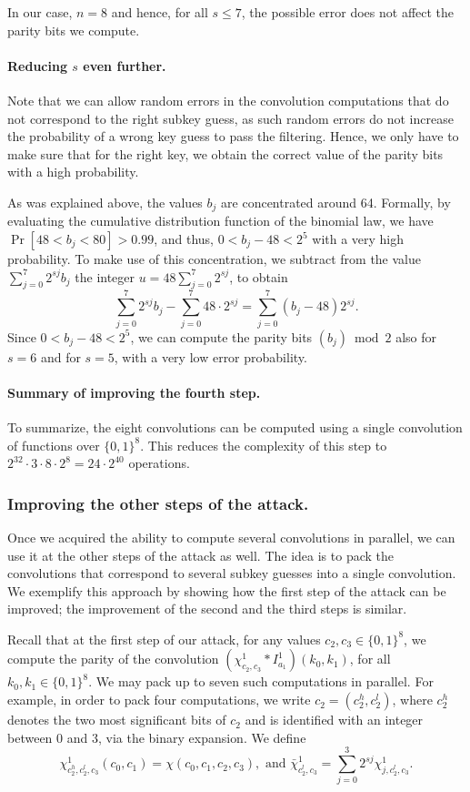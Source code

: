 In our case, $n=8$ and hence, for all $s \leq 7$, the possible error does not affect the parity bits we compute.

\paragraph{Reducing $s$ even further.} Note that we can allow random errors in the convolution computations that do not correspond to the right subkey guess, as such random errors do not increase the probability of a wrong key guess to pass the filtering. Hence, we only have to make sure that for the right key, we obtain the correct value of the parity bits with a high probability.

As was explained above, the values $b_j$ are concentrated around 64.
Formally, by evaluating the cumulative distribution function of the binomial law, we have $\Pr[48 < b_j < 80] >0.99$, and thus, $0<b_j-48<2^5$ with a very high probability.
To make use of this concentration, we subtract from the value  $\sum_{j=0}^7 2^{sj}b_j$ the integer $u=48\sum_{j=0}^7 2^{sj}$, to obtain 
$$
\sum_{j=0}^7 2^{sj}b_j - \sum_{j=0}^7 48 \cdot 2^{sj} = \sum_{j=0}^7 (b_j-48)2^{sj}. 
$$
Since $0<b_j-48<2^5$, we can compute the parity bits $(b_j)\bmod 2$ also for $s=6$ and for $s=5$, with a very low error probability.
\paragraph{Summary of improving the fourth step.} To summarize, the eight convolutions can be computed using a single convolution of functions over $\{0,1\}^8$. This reduces the complexity of this step to $2^{32} \cdot 3 \cdot 8 \cdot 2^8 = 24 \cdot 2^{40}$ operations.

\subsubsection{Improving the other steps of the attack.} Once we acquired the ability to compute several convolutions in parallel, we can use it at the other steps of the attack as well. The idea is to pack the convolutions that correspond to several subkey guesses into a single convolution. We exemplify this approach by showing how the first step of the attack can be improved; the improvement of the second and the third steps is similar. 

Recall that at the first step of our attack, for any values $c_2,c_3 \in \{0,1\}^8$, we compute the parity of the convolution
$(\chi^1_{c_2,c_3} * I^1_{a_1})(k_0,k_1)$, for all $k_0,k_1 \in \{0,1\}^8$. We may pack up to seven such computations in parallel. For example, in order to pack four computations, we write $c_2=(c_2^h,c_2^l)$, where $c_2^h$ denotes the two most significant bits of $c_{2}$ and is identified with an integer between 0 and 3, via the binary expansion. We define
$$
\chi^1_{c_2^h,c_2^l,c_3}(c_0,c_1)=\chi(c_0,c_1,c_2,c_3), \text{ and } \bar{\chi}^{1}_{c_2^l,c_3}=\sum_{j=0}^3 2^{sj} \chi^1_{j,c_2^l,c_3}.
$$

